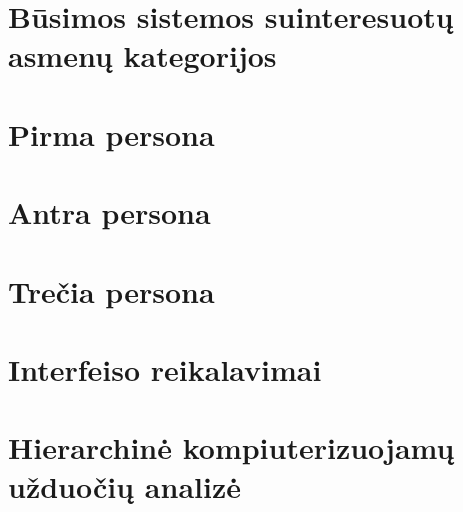   

  \section{Būsimos sistemos suinteresuotų asmenų kategorijos}
  

  \newpage
  \section{Pirma persona}
  

  \newpage
  \section{Antra persona}
  
  
  \newpage
  \section{Trečia persona}
  

  \newpage
  \section{Interfeiso reikalavimai}
  

  \newpage
  \section{Hierarchinė kompiuterizuojamų užduočių analizė}
  
